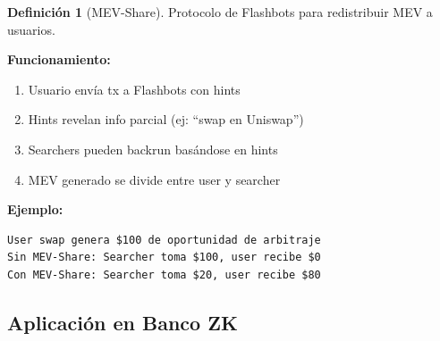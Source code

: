 \documentclass[11pt,a4paper,twoside,openright]{book}
\theoremstyle{definition}
\newtheorem{definition}{Definición}[chapter]
\theoremstyle{plain}
\theoremstyle{remark}
\begin{document}
\begin{definition}[MEV-Share]
Protocolo de Flashbots para redistribuir MEV a usuarios.

\textbf{Funcionamiento:}
\begin{enumerate}
    \item Usuario envía tx a Flashbots con hints
    \item Hints revelan info parcial (ej: ``swap en Uniswap'')
    \item Searchers pueden backrun basándose en hints
    \item MEV generado se divide entre user y searcher
\end{enumerate}

\textbf{Ejemplo:}
\begin{verbatim}
User swap genera $100 de oportunidad de arbitraje
Sin MEV-Share: Searcher toma $100, user recibe $0
Con MEV-Share: Searcher toma $20, user recibe $80
\end{verbatim}
\end{definition}

\subsection{Aplicación en Banco ZK}
\end{document}
